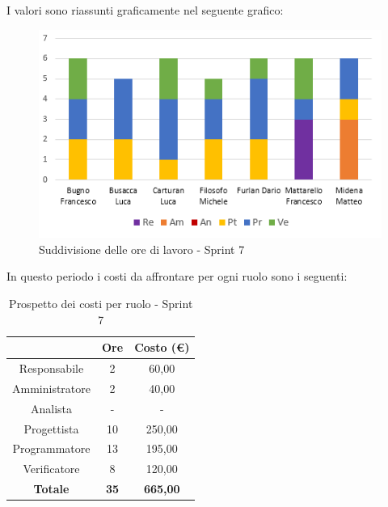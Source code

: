 I valori sono riassunti graficamente nel seguente grafico:

\begin{figure}[H]
  \centering
  \includegraphics[scale=1.0]{immagini/7Sprint_oreLavoro.png}
  \caption{Suddivisione delle ore di lavoro - Sprint 7}
\end{figure}

\pagebreak
In questo periodo i costi da affrontare per ogni ruolo sono i seguenti:

\begin{table}[H]
  \centering
  \renewcommand{\arraystretch}{1.8}
  \begin{tabular}{c|c|c}
    \rowcolor[HTML]{125E28}
    \multicolumn{1}{c}{\color[HTML]{FFFFFF}\textbf{Ruolo}}
                    & \multicolumn{1}{c}{\color[HTML]{FFFFFF}\textbf{Ore}}
                    & \multicolumn{1}{c}{\color[HTML]{FFFFFF}\textbf{Costo (€)}}                   \\
    \hline
    Responsabile    & 2                                                          & 60,00           \\
    Amministratore  & 2                                                          & 40,00           \\
    Analista        & -                                                          & -               \\
    Progettista     & 10                                                         & 250,00          \\
    Programmatore   & 13                                                         & 195,00          \\
    Verificatore    & 8                                                          & 120,00          \\
    \textbf{Totale} & \textbf{35}                                                & \textbf{665,00}
  \end{tabular}
  \caption{Prospetto dei costi per ruolo - Sprint 7}
\end{table}

